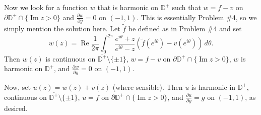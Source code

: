 \documentclass[11pt]{book}
\theoremstyle{definition}
\renewcommand{\Re}{\operatorname{Re}}
\renewcommand{\Im}{\operatorname{Im}}
\begin{document}
\begin{enumerate}
      Now we look for a function $w$ that is harmonic on $\mathbb D^+$ such that $w = f-v$ on $\partial \mathbb D^+ \cap \{ \Im z  > 0 \}$ and $\frac{\partial w}{\partial y} = 0$ on $(-1,1)$.  This is essentially Problem \#4, so we simply mention the solution here.  Let $\widetilde f$ be defined as in Problem \#4 and set 
      \[ w(z) = \Re \frac{1}{2\pi} \int_0^{2\pi} \frac{e^{i\theta} +z}{e^{i\theta} - z} ( \widetilde f(e^{i\theta}) - v(e^{i\theta}) )\, d\theta .\]  Then $w(z)$ is continuous on $\overline{\mathbb D^+} \setminus \{ \pm 1\}$, $w = f-v$ on $\partial \mathbb D^+ \cap \{ \Im z > 0 \}$, $w$ is harmonic on $\mathbb D^+$, and $\frac{\partial w}{\partial y} = 0$ on $(-1,1)$. 

      Now, set $u(z) = w(z) + v(z)$ (where sensible).   Then $u$ is harmonic in $\mathbb D^+$, continuous on $\overline{\mathbb D^+} \setminus \{ \pm 1\}$, $u=f$ on $\partial \mathbb D^+ \cap \{ \Im z > 0\}$, and $\frac{\partial u}{\partial y} = g$ on $(-1,1)$, as desired. 



\end{enumerate}
\end{document}
